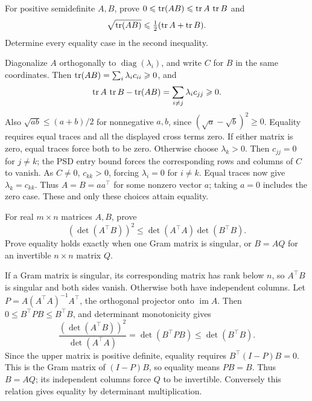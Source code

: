 \begin{problem}\label{ex:12:ineq-ma-14}
For positive semidefinite \(A,B\), prove
\(0\leqslant\operatorname{tr}(AB)\leqslant\operatorname{tr} A\,\operatorname{tr} B\) and
\[\sqrt{\operatorname{tr}(AB)}\leqslant\tfrac12(\operatorname{tr} A+\operatorname{tr} B).\]
Determine every equality case in the second inequality.
\end{problem}
\begin{solution}
Diagonalize \(A\) orthogonally to \(\operatorname{diag}(\lambda_i)\),
and write \(C\) for \(B\) in the same coordinates. Then
\(\operatorname{tr}(AB)=\sum_i\lambda_i c_{ii}\geqslant0\), and
\[
\operatorname{tr} A\,\operatorname{tr} B-\operatorname{tr}(AB)=\sum_{i\ne j}\lambda_i c_{jj}\geqslant0.
\]
Also \(\sqrt{ab}\leqslant(a+b)/2\) for nonnegative \(a,b\), since
\((\sqrt a-\sqrt b)^2\geqslant0\). Equality requires equal traces and
all the displayed cross terms zero. If either matrix is zero, equal
traces force both to be zero. Otherwise choose \(\lambda_k>0\).
Then \(c_{jj}=0\) for \(j\ne k\); the PSD entry bound forces the
corresponding rows and columns of \(C\) to vanish. As \(C\ne0\),
\(c_{kk}>0\), forcing \(\lambda_i=0\) for \(i\ne k\).
Equal traces now give \(\lambda_k=c_{kk}\).
Thus \(A=B=aa^\top\) for some nonzero vector \(a\); taking \(a=0\)
includes the zero case. These and only these choices attain equality.
\end{solution}

\begin{problem}\label{ex:12:ineq-ma-15}
For real \(m\times n\) matrices \(A,B\), prove
\[
(\det(A^\top B))^2\leqslant\det(A^\top A)\det(B^\top B).
\]
Prove equality holds exactly when one Gram matrix is singular, or
\(B=AQ\) for an invertible \(n\times n\) matrix \(Q\).
\end{problem}
\begin{solution}
If a Gram matrix is singular, its corresponding matrix has rank below
\(n\), so \(A^\top B\) is singular and both sides vanish.
Otherwise both have independent columns. Let
\(P=A(A^\top A)^{-1}A^\top\), the orthogonal projector onto
\(\operatorname{im}A\). Then \(0\leqslant B^\top PB\leqslant B^\top B\),
and determinant monotonicity gives
\[
\frac{(\det(A^\top B))^2}{\det(A^\top A)}
=\det(B^\top PB)\leqslant\det(B^\top B).
\]
Since the upper matrix is positive definite, equality requires
\(B^\top(I-P)B=0\). This is the Gram matrix of \((I-P)B\), so equality
means \(PB=B\). Thus \(B=AQ\); its independent columns force \(Q\)
to be invertible. Conversely this relation gives equality by determinant
multiplication.
\end{solution}


